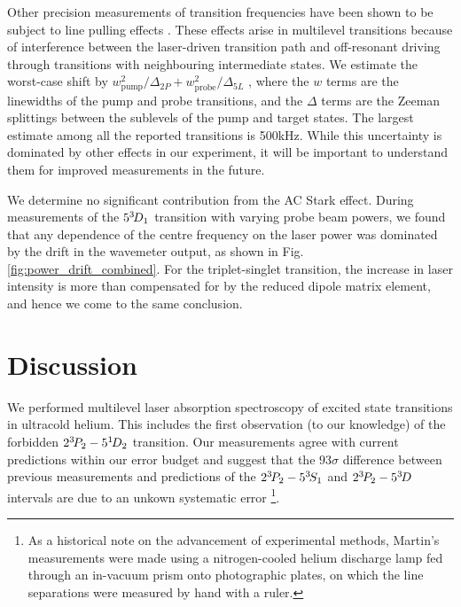Other precision measurements of transition frequencies have been shown to be subject to line pulling effects \cite{Marsman15,Marsman15PRA}.
	These effects arise in multilevel transitions because of interference between the laser-driven transition path and off-resonant driving through transitions with neighbouring intermediate states.
	We estimate the worst-case shift by $w_{\text{pump}}^2/\Delta_{2P} + w_{\text{probe}}^2/\Delta_{5L}$ \cite{Marsman15,Marsman15PRA}, where the $w$ terms are the linewidths of the pump and probe transitions, and the $\Delta$ terms are the Zeeman splittings between the sublevels of the pump and target states.
	The largest estimate among all the reported transitions is 500kHz.
	While this uncertainty is dominated by other effects in our experiment, it will be important to understand them for improved measurements in the future.


We determine no significant contribution from the AC Stark effect.
	During measurements of the $5^{3\!} D_1$ transition with varying probe beam powers, we found that any dependence of the centre frequency on the laser power was dominated by the drift in the wavemeter output, as shown in Fig.
	\ref{fig:power_drift_combined}.
	For the triplet-singlet transition, the increase in laser intensity is more than compensated for by the reduced dipole matrix element, and hence we come to the same conclusion.
	



\section{Discussion}

We performed multilevel laser absorption spectroscopy of excited state transitions in ultracold helium.
	This includes the first observation (to our knowledge) of the forbidden $2^{3\!} P_2 - 5^{1\!} D_2$ transition.
	Our measurements agree with current predictions within our error budget and suggest that the $93\sigma$ difference between previous measurements \cite{Martin60} and predictions \cite{Morton06} of the $2^{3\!}P_2  -  5^{3\!}S_{1}$ and $2^{3\!}P_2  -  5^{3\!}D$ intervals are due to an unkown systematic error \footnote{As a historical note on the advancement of experimental methods, Martin's measurements were made using a nitrogen-cooled helium discharge lamp fed through an in-vacuum prism onto photographic plates, on which the line separations were measured by hand with a ruler.}.
	

